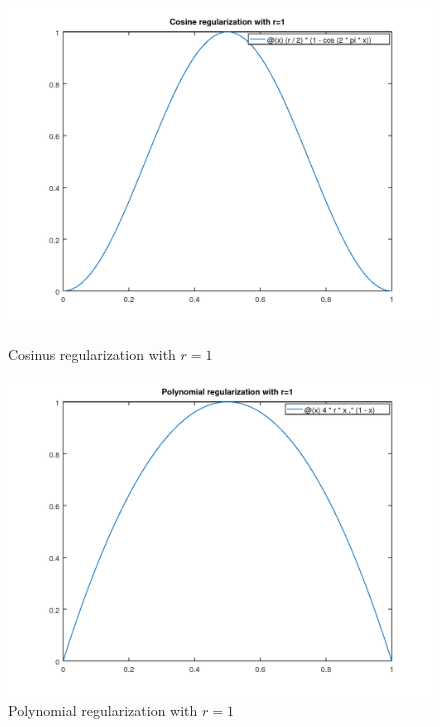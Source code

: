 \begin{figure}
	\centering
	
	\includegraphics[totalheight=0.45\textheight]{img/cos_regul.png}
	\caption{Cosinus regularization with $r=1$}
	\label{fig:cos_regul}
	
	\includegraphics[totalheight=0.45\textheight]{img/poly_regul.png}
	\caption{Polynomial regularization with $r=1$}
	\label{fig:poly_regul}
\end{figure}

